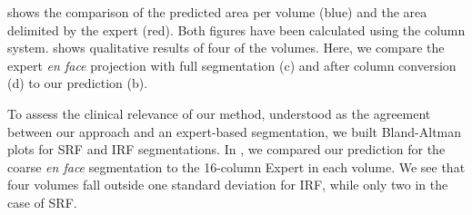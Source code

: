  shows the comparison of the predicted area per volume (blue) and the area delimited by the expert (red). Both figures have been calculated using the column system.  shows qualitative results of four of the volumes. Here, we compare the expert \textit{en face} projection with full segmentation (c) and after column conversion (d) to our prediction (b). 




To assess the clinical relevance of our method, understood as the agreement between our approach and an expert-based segmentation, we built Bland-Altman plots for SRF and IRF segmentations. In , we compared our prediction for the coarse \textit{en face} segmentation to the 16-column Expert in each volume. We see that four volumes fall outside one standard deviation for IRF, while only two in the case of SRF.


